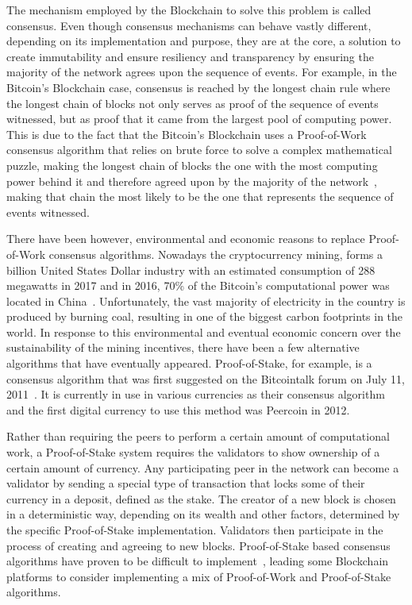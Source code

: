 The mechanism employed by the Blockchain to solve this problem is called
consensus.  Even though consensus mechanisms can behave vastly different,
depending on its implementation and purpose, they are at the core, a solution
to create immutability and ensure resiliency and transparency by ensuring the
majority of the network agrees upon the sequence of events. For example, in the
Bitcoin's Blockchain case, consensus is reached by the longest chain rule where
the longest chain of blocks not only serves as proof of the sequence of events
witnessed, but as proof that it came from the largest pool of computing power.
This is due to the fact that the Bitcoin's Blockchain uses a Proof-of-Work
consensus algorithm that relies on brute force to solve a complex mathematical
puzzle, making the longest chain of blocks the one with the most computing
power behind it and therefore agreed upon by the majority of the
network~\cite{Baars2016,Wood2017}, making that chain the most likely to be the
one that represents the sequence of events witnessed.

There have been however, environmental and economic reasons to replace
Proof-of-Work consensus algorithms. Nowadays the cryptocurrency mining, forms a
billion United States Dollar industry with an estimated consumption of 288
megawatts in 2017 and in 2016, 70\% of the Bitcoin's computational power was
located in China~\cite{BitcoinMining2017}.  Unfortunately, the vast majority of
electricity in the country is produced by burning coal, resulting in one of the
biggest carbon footprints in the world. In response to this environmental and
eventual economic concern over the sustainability of the mining incentives,
there have been a few alternative algorithms that have eventually appeared.
Proof-of-Stake, for example, is a consensus algorithm that was first suggested
on the Bitcointalk forum on July 11, 2011~\cite{bitcoinForums2018}. It is
currently in use in various currencies as their consensus algorithm and the
first digital currency to use this method was Peercoin in 2012. 

Rather than requiring the peers to perform a certain amount of computational
work, a Proof-of-Stake system requires the validators to show ownership of a
certain amount of currency. Any participating peer in the network can become a
validator by sending a special type of transaction that locks some of their
currency in a deposit, defined as the stake. The creator of a new block is
chosen in a deterministic way, depending on its wealth and other factors,
determined by the specific Proof-of-Stake implementation. Validators then
participate in the process of creating and agreeing to new blocks.
Proof-of-Stake based consensus algorithms have proven to be difficult to
implement~\cite{EthereumSlasher2014}, leading some Blockchain platforms to
consider implementing a mix of Proof-of-Work and Proof-of-Stake algorithms.


